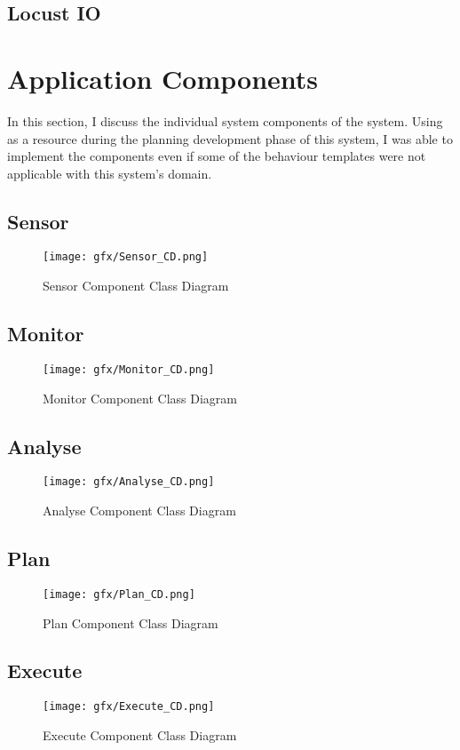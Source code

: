 \subsection{Locust IO}
\cite{locustIO}
\section{Application Components}
In this section, I discuss the individual system components of the system. Using \cite{iglesia2015mape} as a resource during the planning development phase of this system, I was able to implement the components even if some of the behaviour templates were not applicable with this system's domain.

\subsection{Sensor}
\begin{figure} [H]
   \centering 
   \texttt{[image: gfx/Sensor\_CD.png]}
   \caption{ Sensor Component Class Diagram} 
   \label{Fig:2} 
\end{figure}

\subsection{Monitor}
\begin{figure} [H]
   \centering 
   \texttt{[image: gfx/Monitor\_CD.png]}
   \caption{ Monitor Component Class Diagram} 
   \label{Fig:3} 
\end{figure}

\subsection{Analyse}
\begin{figure} [H]
   \centering 
   \texttt{[image: gfx/Analyse\_CD.png]}
   \caption{ Analyse Component Class Diagram} 
   \label{Fig:4} 
\end{figure}

\subsection{Plan}
\begin{figure} [H]
   \centering 
   \texttt{[image: gfx/Plan\_CD.png]}
   \caption{Plan Component Class Diagram} 
   \label{Fig:5} 
\end{figure}

\subsection{Execute}
\begin{figure}[H]
   \centering 
   \texttt{[image: gfx/Execute\_CD.png]}
   \caption{Execute Component Class Diagram} 
   \label{Fig:6} 
\end{figure}




